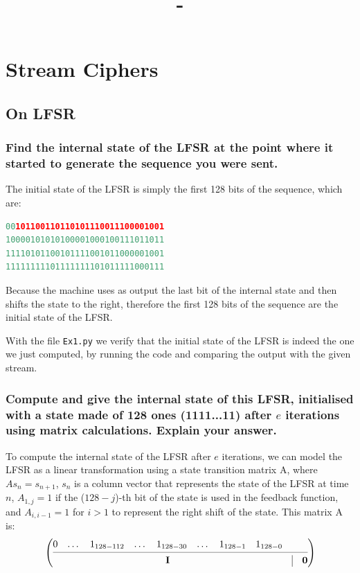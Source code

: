 \documentclass{article}
\date{}
\title{\textit{\course} - \labName}
\author{\me}
\begin{document}
\maketitle
\section{Stream Ciphers}
\subsection{On LFSR}
\subsubsection{Find the internal state of the LFSR at the point where it started to generate the sequence you were sent.}
The initial state of the LFSR is simply the first 128 bits of the sequence, which are:
\begin{lstlisting}[language=Python]
00101100110110101110011100001001
10000101010100001000100111011011
11110101100101111001011000001001
11111111101111111101011111000111
\end{lstlisting}
Because the machine uses as output the last bit of the internal state and then shifts the state to the right, therefore the first 128 bits of the sequence are the initial state of the LFSR.

With the file \texttt{Ex1.py} we verify that the initial state of the LFSR is indeed the one we just computed, by running the code and comparing the output with the given stream.

\subsubsection{Compute and give the internal state of this LFSR, initialised with a state made of 128 ones (1111...11) after \texorpdfstring{$e$}{e} iterations using matrix calculations. Explain your answer.}
To compute the internal state of the LFSR after $e$ iterations, we can model the LFSR as a linear transformation using a state transition matrix A, where $A s_n = s_{n+1}$, $s_n$ is a column vector that represents the state of the LFSR at time $n$, $A_{1, j} = 1$ if the ($128-j$)-th bit of the state is used in the feedback function, and $A_{i, i-1} = 1$ for $i>1$ to represent the right shift of the state.
This matrix A is:\\

\begin{equation}
\left( \begin{array}{@{}c c@{}}
    \begin{matrix}
        0 & \dots & 1_{128-112} & \dots & 1_{128-30}& \dots & 1_{128-1} & 1_{128-0} \\
    \end{matrix} \\
    \cmidrule{1-2}

    \textbf{I} & \vline \quad \textbf{0}
    \end{array}
\right)
\end{equation}
\end{document}
